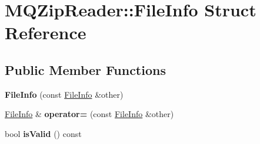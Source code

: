 \hypertarget{struct_m_q_zip_reader_1_1_file_info}{}\section{M\+Q\+Zip\+Reader\+:\+:File\+Info Struct Reference}
\label{struct_m_q_zip_reader_1_1_file_info}
\subsection*{Public Member Functions}
\begin{DoxyCompactItemize}
\item 
\mbox{\label{struct_m_q_zip_reader_1_1_file_info_a1d2fc60bcf96232ec95b5d8ee1f3f5d1}} 
{\bfseries File\+Info} (const \hyperlink{struct_m_q_zip_reader_1_1_file_info}{File\+Info} \&other)
\item 
\mbox{\label{struct_m_q_zip_reader_1_1_file_info_a1ac2b1e6e092235649c0cac56ade0cc8}} 
\hyperlink{struct_m_q_zip_reader_1_1_file_info}{File\+Info} \& {\bfseries operator=} (const \hyperlink{struct_m_q_zip_reader_1_1_file_info}{File\+Info} \&other)
\item 
\mbox{\label{struct_m_q_zip_reader_1_1_file_info_a3c7b75ef9c7370d514338c7635984d3f}} 
bool {\bfseries is\+Valid} () const
\end{DoxyCompactItemize}
